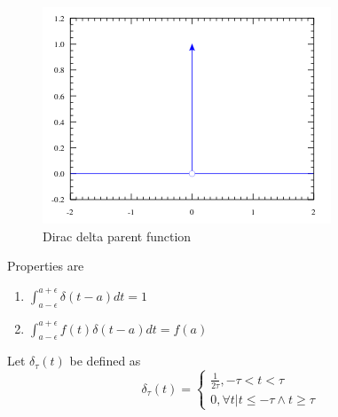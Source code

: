 \begin{figure}[H]
    \centering
    \includegraphics[scale=0.6]{figures/dirac.png}
    \caption{Dirac delta parent function}
\end{figure}

Properties are
\begin{enumerate}
    \item $\int_{a-\epsilon}^{a+\epsilon} \delta(t-a)dt=1$
    \item $\int_{a-\epsilon}^{a+\epsilon} f(t)\delta(t-a)dt=f(a)$
\end{enumerate}

Let $\delta_\tau(t)$ be defined as
\begin{equation*}
    \delta_\tau(t)=\begin{cases}
        \frac{1}{2\tau},-\tau<t<\tau\\
        0, \forall t|t\leq-\tau\land t\geq \tau
    \end{cases}
\end{equation*}

